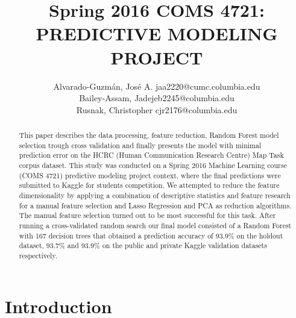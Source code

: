 \documentclass[twoside,11pt]{article}
\begin{document}
\title{Spring 2016 COMS 4721: PREDICTIVE MODELING PROJECT}

\author{\name Alvarado-Guzm\'an, Jos\'e A.  \email jaa2220@cumc.columbia.edu \\
       \name Bailey-Assam, Jade\email jeb2245@columbia.edu \\
       \name Rusnak, Christopher  \email cjr2176@columbia.edu \\
      }


\maketitle

\begin{abstract}%
This paper describes the data processing, feature reduction, Random Forest model selection trough cross validation and finally presents the model with minimal prediction error on the HCRC (Human Communication Research Centre) Map Task corpus dataset. This study was conducted on a Spring 2016 Machine Learning course (COMS 4721) predictive modeling project  context, where the final predictions were submitted to Kaggle for students competition. 
We attempted to reduce the feature dimensionality by applying a combination of descriptive statistics and feature research for a manual feature selection and Lasso Regression and PCA  as reduction algorithms. The manual feature selection turned out to be most successful for this task. After running a cross-validated random search our final model consisted of a Random Forest with 167 decision trees that obtained a prediction accuracy of 93.9\% on the holdout dataset, 93.7\% and 93.9\% on the public and private Kaggle validation datasets respectively.
\end{abstract}


\section{Introduction}
\end{document}
